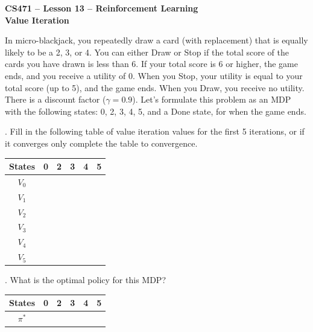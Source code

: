 \documentclass{article}
\begin{document}
\noindent \textbf{CS471 – Lesson 13 – Reinforcement Learning} \\
\textbf{Value Iteration}

\vspace{0.5cm}
\noindent In micro-blackjack, you repeatedly draw a card (with replacement) that is equally likely to be a 2, 3, or 4. You can either Draw or Stop if the total score of the cards you have drawn is less than 6. If your total score is 6 or higher, the game ends, and you receive a utility of 0. When you Stop, your utility is equal to your total score (up to 5), and the game ends. When you Draw, you receive no utility. There is a discount factor ($\gamma=0.9$). Let's formulate this problem as an MDP with the following states: 0, 2, 3, 4, 5, and a Done state, for when the game ends.

\vspace{0.5cm}
. Fill in the following table of value iteration values for the first 5 iterations, or if it converges only complete the table to convergence.

\vspace{0.3cm}
\begin{center}
\renewcommand{\arraystretch}{2} %
\begin{tabular}{|c|c|c|c|c|c|}
\hline
\textbf{States} & \textbf{0} & \textbf{2} & \textbf{3} & \textbf{4} & \textbf{5} \\
\hline
$V_0$ & \hspace{1.5cm} & \hspace{1.5cm} & \hspace{1.5cm} & \hspace{1.5cm} & \hspace{1.5cm} \\
\hline
$V_1$ & & & & & \\
\hline
$V_2$ & & & & & \\
\hline
$V_3$ & & & & & \\
\hline
$V_4$ & & & & & \\
\hline
$V_5$ & & & & & \\
\hline
\end{tabular}
\end{center}

\vspace{0.5cm}
. What is the optimal policy for this MDP?

\vspace{0.3cm}
\begin{center}
\renewcommand{\arraystretch}{2}
\begin{tabular}{|c|c|c|c|c|c|}
\hline
\textbf{States} & \textbf{0} & \textbf{2} & \textbf{3} & \textbf{4} & \textbf{5} \\
\hline
$\pi^*$ & \hspace{1.5cm} & \hspace{1.5cm} & \hspace{1.5cm} & \hspace{1.5cm} & \hspace{1.5cm} \\
\hline
\end{tabular}
\end{center}
\end{document}

